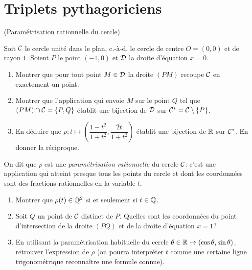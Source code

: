 \documentclass[a4paper,11pt,reqno]{amsart}
\begin{document}
\section{Triplets pythagoriciens}

\begin{exo}\label{cerclerat} (Paramétrisation rationnelle du cercle)

  Soit $\mathcal{C}$ le cercle unité dans le plan, c.-à-d. le cercle de centre $O=(0,0)$ et de rayon $1$. Soient $P$ le point $(-1,0)$ et $\mathcal{D}$ la droite d'équation $x=0$.
  \begin{enumerate}
    \item Montrer que pour tout point $M \in \mathcal{D}$ la droite $(PM)$ recoupe $\mathcal{C}$ en exactement un point.
    \item Montrer que l'application qui envoie $M$ sur le point $Q$ tel que $(PM) \cap \mathcal{C} =\{P,Q\}$ établit une bijection de $\mathcal{D}$ sur $\mathcal{C}^\ast=\mathcal{C} \setminus \{P\}$.
    \item En déduire que $\rho \colon t \longmapsto \left( \dfrac{1-t^2}{1+t^2}, \dfrac{2t}{1+t^2}\right)$ établit une bijection de $\mathbb{R}$ sur $\mathcal{C}^\ast$. En donner la réciproque.
  \end{enumerate}
  \begin{convention}
      On dit que $\rho$ est une \emph{paramétrisation rationnelle} du cercle $\mathcal{C}$: c'est une application qui atteint presque tous les points du cercle et dont les coordonnées sont des fractions rationnelles en la variable $t$.
  \end{convention}
  \begin{enumerate}[resume]
    \item Montrer que $\rho(t) \in \mathbb{Q}^2$ si et seulement si $t \in \mathbb{Q}$.
    \item Soit $Q$ un point de $\mathcal{C}$ distinct de $P$. Quelles sont les coordonnées du point d'intersection de la droite $(PQ)$ et de la droite d'équation $x=1$?
    \item En utilisant la paramétrisation habituelle du cercle $\theta \in \mathbb{R} \mapsto (\cos \theta,\sin \theta)$, retrouver l'expression de $\rho$ (on pourra interpréter $t$ comme une certaine ligne trigonométrique reconnaître une formule connue).
  \end{enumerate}
\end{exo}
\end{document}
